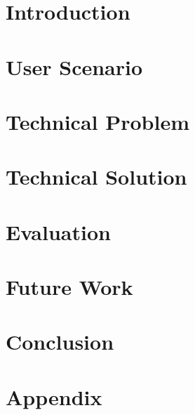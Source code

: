 \documentclass[10pt, a4paper, twocolumn]{article} %
\begin{document}



\section{Introduction}


\section{User Scenario}


\section{Technical Problem}


\section{Technical Solution}


\section{Evaluation}


\section{Future Work}


\section{Conclusion}


\section{Appendix}


\onecolumn{}
\printbibliography[]
\end{document}

